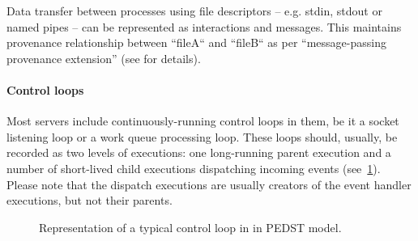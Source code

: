 Data transfer between processes using file descriptors -- e.g. stdin, stdout or named pipes -- can be represented as interactions and messages. This maintains provenance relationship between ``fileA`` and ``fileB`` as per ``message-passing provenance extension'' (see  for details). 

\paragraph{Control loops}

Most servers include continuously-running control loops in them, be it a socket listening loop or a work queue processing loop. These loops should, usually, be recorded as two levels of executions: one long-running parent execution and a number of short-lived child executions dispatching incoming events (see~\cref{fig:control-loops}). Please note that the dispatch executions are usually creators of the event handler executions, but not their parents.

\begin{figure}[t]
\centering
{}
\caption{Representation of a typical control loop in in PEDST model.}
\label{fig:control-loops}
\end{figure}

\begin{comment}
BRAK CZASU
\subsection{Entity lifecycle}

TODO: Describe how provenance needs to be tracked with Tenmo:

\begin{itemize}
	\item Whenever an entity is changed (e.g. it’s update time in DB is changed), a new incarnation is created, hence a process responsible for the operation needs to log a write operation with the new incarnation.
\end{itemize}

TODO: Code example.

TODO: Image.
\end{comment}

